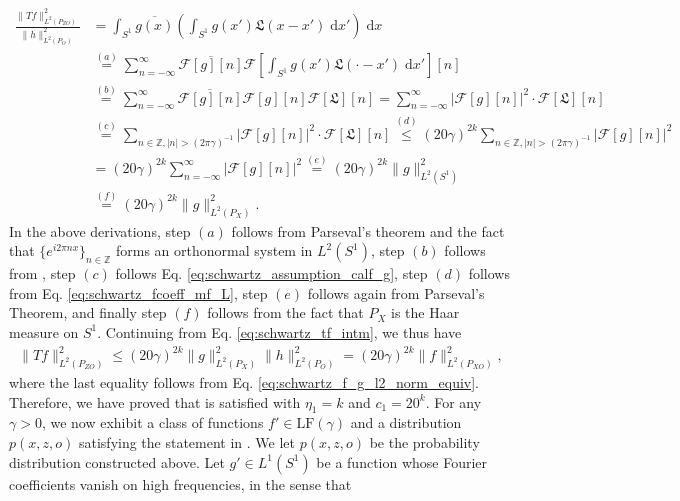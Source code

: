 \documentclass[11pt]{article}
\newcommand{\calF}{\mathcal{F}}
\newcommand{\0}{\mathbf{0}}
\begin{document}
\begin{appendix}
\begin{align}
    \frac{\|Tf\|^2_{L^2(P_{ZO})}}{\|h\|^2_{L^2(P_{O})}}
    &= \int_{S^1}\overline{g(x)}\left(\int_{S^1}g(x')\mathfrak{L}(x-x')\;\mathrm{d}x'\right)\;\mathrm{d}x\nonumber\\
    &\stackrel{(a)}{=} \sum_{n = -\infty}^{\infty}\overline{\calF[g][n]}\calF\left[\int_{S^1}g(x')\mathfrak{L}(\cdot -x')\;\mathrm{d}x'\right][n]\nonumber\\
    &\stackrel{(b)}{=} \sum_{n = -\infty}^{\infty}\overline{\calF[g][n]}\calF[g][n]\calF[\mathfrak{L}][n] = \sum_{n=-\infty}^{\infty}|\calF[g][n]|^2\cdot \calF[\mathfrak{L}][n]\label{eq: example_ratio}\\
    &\stackrel{(c)}{=} \sum_{n\in \mathbb{Z}, |n|> (2\pi\gamma)^{-1}}|\calF[g][n]|^2\cdot \calF[\mathfrak{L}][n] \stackrel{(d)}{\leq} (20\gamma)^{2k}\sum_{n\in \mathbb{Z}, |n|> (2\pi\gamma)^{-1}}|\calF[g][n]|^2\nonumber\\
    &= (20\gamma)^{2k}\sum_{n=-\infty}^{\infty}|\calF[g][n]|^2 \stackrel{(e)}{=} (20\gamma)^{2k}\|g\|^2_{L^2(S^1)}\nonumber\\
    &\stackrel{(f)}{=} (20\gamma)^{2k}\|g\|^2_{L^2(P_{X})}. \nonumber
\end{align}
In the above derivations, step $(a)$ follows from Parseval's theorem \citep[5.4]{Katznelson_2004} and the fact that $\{e^{i2\pi nx}\}_{n\in \mathbb{Z}}$ forms an orthonormal system in $L^2(S^{1})$, step $(b)$ follows from , step $(c)$ follows Eq. \eqref{eq:schwartz_assumption_calf_g}, step $(d)$ follows from Eq. \eqref{eq:schwartz_fcoeff_mf_L}, step $(e)$ follows again from Parseval's Theorem, and finally step $(f)$ follows from the fact that $P_{X}$ is the Haar measure on $S^1$.  Continuing from Eq. \eqref{eq:schwartz_tf_intm}, we thus have
\begin{align*}
    \|Tf\|^2_{L^2(P_{ZO})}\leq (20\gamma)^{2k}\|g\|^2_{L^2(P_{X})}\|h\|^2_{L^2(P_{O})} = (20\gamma)^{2k}\|f\|^2_{L^2(P_{XO})},
\end{align*}
where the last equality follows from Eq. \eqref{eq:schwartz_f_g_l2_norm_equiv}. Therefore, we have proved that  is satisfied with $\eta_1 = k$ and $c_1 = 20^k$. For any $\gamma>0$, we now exhibit a class of functions $f'\in \mathrm{LF}(\gamma)$ and a distribution $p(x,z,o)$ satisfying the statement in . We let $p(x,z,o)$ be the probability distribution constructed above. Let $g'\in L^1(S^1)$ be a function whose Fourier coefficients vanish on high frequencies, in the sense that 
\begin{align*}

\end{align*}
\end{appendix}
\end{document}
